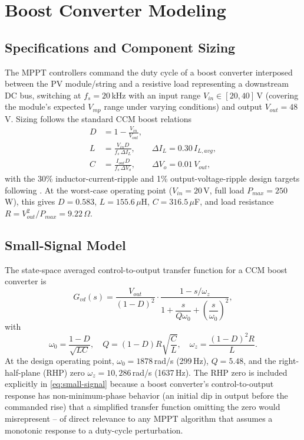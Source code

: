 \section{Boost Converter Modeling}
\label{sec:converter-model}

\subsection{Specifications and Component Sizing}
The MPPT controllers command the duty cycle of a boost converter interposed
between the PV module/string and a resistive load representing a downstream
DC bus, switching at $f_s=20\,$kHz with an input range
$V_{in}\in[20,40]\,$V (covering the module's expected $V_{mp}$ range under
varying conditions) and output $V_{out}=48\,$V. Sizing follows the standard
CCM boost relations
\begin{align}
D &= 1 - \frac{V_{in}}{V_{out}}, \\
L &= \frac{V_{in} D}{f_s \, \Delta I_L}, \qquad \Delta I_L = 0.30\, I_{L,avg}, \\
C &= \frac{I_{out} D}{f_s \, \Delta V_o}, \qquad \Delta V_o = 0.01\, V_{out},
\end{align}
with the 30\% inductor-current-ripple and 1\% output-voltage-ripple design
targets following \cite{erickson2001fundamentals}. At the worst-case
operating point ($V_{in}=20\,$V, full load $P_{max}=250\,$W), this gives
$D=0.583$, $L=155.6\,\mu$H, $C=316.5\,\mu$F, and load resistance
$R=V_{out}^2/P_{max}=9.22\,\Omega$.

\subsection{Small-Signal Model}
The state-space averaged control-to-output transfer function for a CCM
boost converter is
\begin{equation}
G_{vd}(s) = \frac{V_{out}}{(1-D)^2} \cdot
\frac{1 - s/\omega_z}{1 + \dfrac{s}{Q\omega_0} + \left(\dfrac{s}{\omega_0}\right)^2},
\label{eq:small-signal}
\end{equation}
with
\begin{equation}
\omega_0 = \frac{1-D}{\sqrt{LC}}, \quad
Q = (1-D)R\sqrt{\frac{C}{L}}, \quad
\omega_z = \frac{(1-D)^2 R}{L}.
\end{equation}
At the design operating point, $\omega_0 = 1878\,$rad/s (299\,Hz),
$Q=5.48$, and the right-half-plane (RHP) zero $\omega_z=10{,}286\,$rad/s
(1637\,Hz). The RHP zero is included explicitly in \eqref{eq:small-signal}
because a boost converter's control-to-output response has non-minimum-phase
behavior (an initial dip in output before the commanded rise) that a
simplified transfer function omitting the zero would misrepresent -- of
direct relevance to any MPPT algorithm that assumes a monotonic response to
a duty-cycle perturbation.

